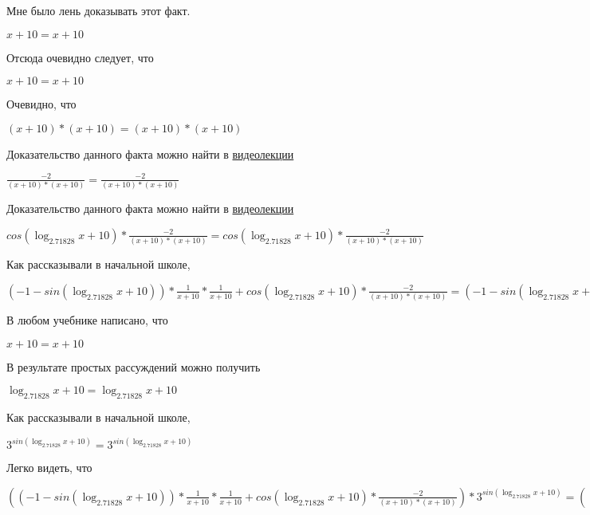 \documentclass[12pt,a4paper,fleqn]{article}
\theoremstyle{definition}
\begin{document}
Мне было лень доказывать этот факт.

$ x  +  10  =  x  +  10 $

Отсюда очевидно следует, что

$ x  +  10  =  x  +  10 $

Очевидно, что

$( x  +  10 ) * ( x  +  10 ) = ( x  +  10 ) * ( x  +  10 )$

Доказательство данного факта можно найти в \href{https://www.youtube.com/watch?v=dQw4w9WgXcQ}{видеолекции}

$\frac{ -2 }{( x  +  10 ) * ( x  +  10 )}
 = \frac{ -2 }{( x  +  10 ) * ( x  +  10 )}
$

Доказательство данного факта можно найти в \href{https://www.youtube.com/watch?v=dQw4w9WgXcQ}{видеолекции}

$cos(\log_{ 2.71828 }{ x  +  10 }) * \frac{ -2 }{( x  +  10 ) * ( x  +  10 )}
 = cos(\log_{ 2.71828 }{ x  +  10 }) * \frac{ -2 }{( x  +  10 ) * ( x  +  10 )}
$

Как рассказывали в начальной школе,

$( -1  - sin(\log_{ 2.71828 }{ x  +  10 })) * \frac{ 1 }{ x  +  10 }
 * \frac{ 1 }{ x  +  10 }
 + cos(\log_{ 2.71828 }{ x  +  10 }) * \frac{ -2 }{( x  +  10 ) * ( x  +  10 )}
 = ( -1  - sin(\log_{ 2.71828 }{ x  +  10 })) * \frac{ 1 }{ x  +  10 }
 * \frac{ 1 }{ x  +  10 }
 + cos(\log_{ 2.71828 }{ x  +  10 }) * \frac{ -2 }{( x  +  10 ) * ( x  +  10 )}
$

В любом учебнике написано, что

$ x  +  10  =  x  +  10 $

В результате простых рассуждений можно получить

$\log_{ 2.71828 }{ x  +  10 } = \log_{ 2.71828 }{ x  +  10 }$

Как рассказывали в начальной школе,

${ 3 }^{sin(\log_{ 2.71828 }{ x  +  10 })} = { 3 }^{sin(\log_{ 2.71828 }{ x  +  10 })}$

Легко видеть, что

$(( -1  - sin(\log_{ 2.71828 }{ x  +  10 })) * \frac{ 1 }{ x  +  10 }
 * \frac{ 1 }{ x  +  10 }
 + cos(\log_{ 2.71828 }{ x  +  10 }) * \frac{ -2 }{( x  +  10 ) * ( x  +  10 )}
) * { 3 }^{sin(\log_{ 2.71828 }{ x  +  10 })} = (( -1  - sin(\log_{ 2.71828 }{ x  +  10 })) * \frac{ 1 }{ x  +  10 }
 * \frac{ 1 }{ x  +  10 }
 + cos(\log_{ 2.71828 }{ x  +  10 }) * \frac{ -2 }{( x  +  10 ) * ( x  +  10 )}
) * { 3 }^{sin(\log_{ 2.71828 }{ x  +  10 })}$
\end{document}
